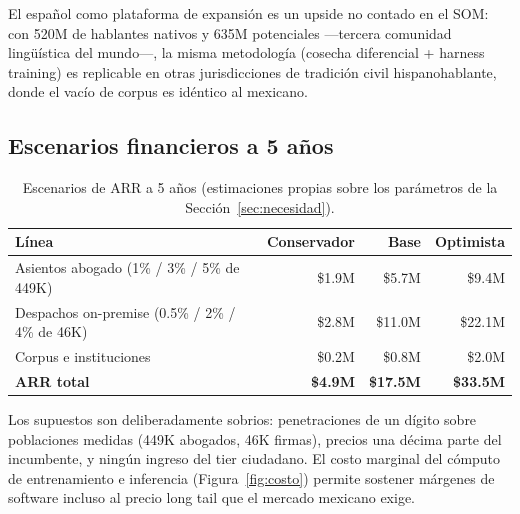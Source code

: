 El español como plataforma de expansión es un upside no contado en el SOM: con 520M de hablantes nativos y 635M potenciales ---tercera comunidad lingüística del mundo---,\cite{cervantes2025} la misma metodología (cosecha diferencial + harness training) es replicable en otras jurisdicciones de tradición civil hispanohablante, donde el vacío de corpus es idéntico al mexicano.

\subsection{Escenarios financieros a 5 años}

\begin{table}[H]
\centering\small
\caption{Escenarios de ARR a 5 años (estimaciones propias sobre los parámetros de la Sección~\ref{sec:necesidad}).}
\label{tab:escenarios}
\begin{tabular}{@{}lrrr@{}}
\toprule
\textbf{Línea} & \textbf{Conservador} & \textbf{Base} & \textbf{Optimista} \\
\midrule
Asientos abogado (1\% / 3\% / 5\% de 449K) & \$1.9M & \$5.7M & \$9.4M \\
Despachos on-premise (0.5\% / 2\% / 4\% de 46K) & \$2.8M & \$11.0M & \$22.1M \\
Corpus e instituciones & \$0.2M & \$0.8M & \$2.0M \\
\midrule
\textbf{ARR total} & \textbf{\$4.9M} & \textbf{\$17.5M} & \textbf{\$33.5M} \\
\bottomrule
\end{tabular}
\end{table}

Los supuestos son deliberadamente sobrios: penetraciones de un dígito sobre poblaciones medidas (449K abogados, 46K firmas),\cite{mirada360,industryresearch2026} precios una décima parte del incumbente,\cite{vaquill2026} y ningún ingreso del tier ciudadano. El costo marginal del cómputo de entrenamiento e inferencia (Figura~\ref{fig:costo}) permite sostener márgenes de software incluso al precio long tail que el mercado mexicano exige.
